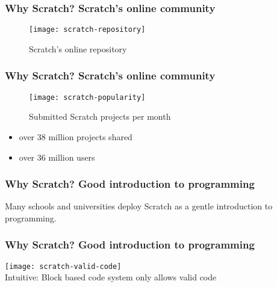 \begin{frame}\frametitle{Why Scratch? Scratch's online community}
    \begin{figure}
        \texttt{[image: scratch-repository]}
        \caption{Scratch's online repository}
    \end{figure}
\end{frame}

\begin{frame}[shrink=0]\frametitle{Why Scratch? Scratch's online community}
    \begin{figure}
        \texttt{[image: scratch-popularity]}
        \caption{Submitted Scratch projects per month}
    \end{figure}
    \centering
    \begin{minipage}{.7\textwidth}
        \begin{itemize}
            \item over 38 million projects shared
            \item over 36 million users
        \end{itemize}
    \end{minipage}
\end{frame}

\begin{frame}\frametitle{Why Scratch? Good introduction to programming}
    Many schools and universities deploy Scratch as a gentle introduction to programming.
\end{frame}

\begin{frame}\frametitle{Why Scratch? Good introduction to programming}
    \centering
    \texttt{[image: scratch-valid-code]}\\[\medskipamount]
    Intuitive: Block based code system only allows valid code
\end{frame}


